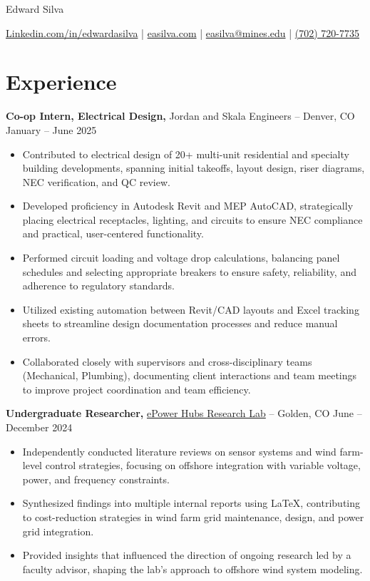 \documentclass[11pt]{article}       %
\begin{document}
\centerline{\huge Edward Silva}
\vspace{5pt}

\centerline{
\href{https://www.linkedin.com/in/edwardasilva/}{Linkedin.com/in/edwardasilva}
| \href{https://easilva.com}{easilva.com}
| \href{mailto:easilva@mines.edu}{easilva@mines.edu} 
| \href{tel:7027207735}{(702) 720-7735}
}

\vspace{-14pt}
\section*{Experience}
\vspace{5pt}

\textbf{Co-op Intern, Electrical Design, }{Jordan and Skala Engineers} -- Denver, CO \hfill January -- June 2025 \\
\vspace{-6.5pt}
\begin{itemize}
  \item Contributed to electrical design of 20+ multi-unit residential and specialty building developments, spanning initial takeoffs, layout design, riser diagrams, NEC verification, and QC review.
  \item Developed proficiency in Autodesk Revit and MEP AutoCAD, strategically placing electrical receptacles, lighting, and circuits to ensure NEC compliance and practical, user-centered functionality.
  \item Performed circuit loading and voltage drop calculations, balancing panel schedules and selecting appropriate breakers to ensure safety, reliability, and adherence to regulatory standards.
  \item Utilized existing automation between Revit/CAD layouts and Excel tracking sheets to streamline design documentation processes and reduce manual errors.
  \item Collaborated closely with supervisors and cross-disciplinary teams (Mechanical, Plumbing), documenting client interactions and team meetings to improve project coordination and team efficiency.
\end{itemize}

\textbf{Undergraduate Researcher, }{\href{https://www.epowerhubs.com/home}{ePower Hubs Research Lab}} -- Golden, CO \hfill June -- December 2024 \\
\vspace{-6.5pt}
\begin{itemize}
  \item Independently conducted literature reviews on sensor systems and wind farm-level control strategies, focusing on offshore integration with variable voltage, power, and frequency constraints.
  \item Synthesized findings into multiple internal reports using LaTeX, contributing to cost-reduction strategies in wind farm grid maintenance, design, and power grid integration.
  \item Provided insights that influenced the direction of ongoing research led by a faculty advisor, shaping the lab's approach to offshore wind system modeling.
\end{itemize}
\end{document}
